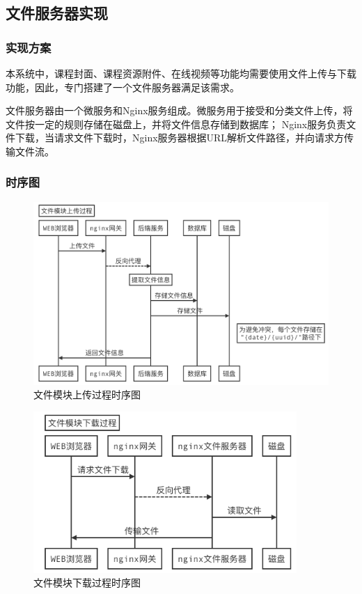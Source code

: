 \documentclass[titlepage,UTF8,linespread=1.5]{ctexart}
\begin{document}
\subsection{文件服务器实现}
\subsubsection{实现方案}
本系统中，课程封面、课程资源附件、在线视频等功能均需要使用文件上传与下载功能，因此，专门搭建了一个文件服务器满足该需求。\par
文件服务器由一个微服务和Nginx服务组成。微服务用于接受和分类文件上传，将文件按一定的规则存储在磁盘上，并将文件信息存储到数据库；
Nginx服务负责文件下载，当请求文件下载时，Nginx服务器根据URL解析文件路径，并向请求方传输文件流。\par
\subsubsection{时序图}
\begin{figure}[H]
    \centering
    \includegraphics[width=150mm]{seq-file-upload.png}
    \caption{文件模块上传过程时序图}
    \label{fig:seq-file-upload}
\end{figure}
\begin{figure}[H]
    \centering
    \includegraphics[width=100mm]{seq-file-download.png}
    \caption{文件模块下载过程时序图}
    \label{fig:seq-file-download}
\end{figure}
\end{document}
